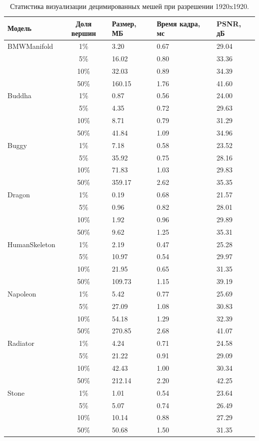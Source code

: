 \begin{table}[htbp]
  \centering
  \scriptsize
  \caption{Статистика визуализации децимированных мешей при разрешении 1920x1920.}
  \label{tab:decimated_stats_1920}
  \begin{tabular}{lcp{2cm}p{2.5cm}p{2.5cm}}
    \toprule
    \textbf{Модель} & \textbf{Доля вершин} & \textbf{Размер, МБ} & \textbf{Время кадра, мс} & \textbf{PSNR, дБ} \\
\midrule
    BMWManifold & 1\% & 3.20 & 0.67 & 29.04 \\
     & 5\% & 16.02 & 0.80 & 33.36 \\
     & 10\% & 32.03 & 0.89 & 34.39 \\
     & 50\% & 160.15 & 1.76 & 41.60 \\
    \midrule
    Buddha & 1\% & 0.87 & 0.56 & 24.00 \\
     & 5\% & 4.35 & 0.72 & 29.63 \\
     & 10\% & 8.71 & 0.79 & 31.29 \\
     & 50\% & 41.84 & 1.09 & 34.96 \\
    \midrule
    Buggy & 1\% & 7.18 & 0.58 & 23.52 \\
     & 5\% & 35.92 & 0.75 & 28.16 \\
     & 10\% & 71.83 & 1.03 & 29.83 \\
     & 50\% & 359.17 & 2.62 & 35.35 \\
    \midrule
    Dragon & 1\% & 0.19 & 0.68 & 21.57 \\
     & 5\% & 0.96 & 0.82 & 28.01 \\
     & 10\% & 1.92 & 0.96 & 29.89 \\
     & 50\% & 9.62 & 1.25 & 35.31 \\
    \midrule
    HumanSkeleton & 1\% & 2.19 & 0.47 & 25.28 \\
     & 5\% & 10.97 & 0.54 & 29.97 \\
     & 10\% & 21.95 & 0.65 & 31.35 \\
     & 50\% & 109.73 & 1.15 & 39.19 \\
    \midrule
    Napoleon & 1\% & 5.42 & 0.77 & 25.69 \\
     & 5\% & 27.09 & 1.08 & 30.83 \\
     & 10\% & 54.18 & 1.29 & 32.39 \\
     & 50\% & 270.85 & 2.68 & 41.07 \\
    \midrule
    Radiator & 1\% & 4.24 & 0.71 & 24.58 \\
     & 5\% & 21.22 & 0.91 & 29.09 \\
     & 10\% & 42.43 & 1.00 & 30.34 \\
     & 50\% & 212.14 & 2.20 & 42.25 \\
    \midrule
    Stone & 1\% & 1.01 & 0.54 & 23.64 \\
     & 5\% & 5.07 & 0.74 & 26.49 \\
     & 10\% & 10.14 & 0.88 & 27.29 \\
     & 50\% & 50.68 & 1.50 & 31.35 \\
    \bottomrule
  \end{tabular}
\end{table}
